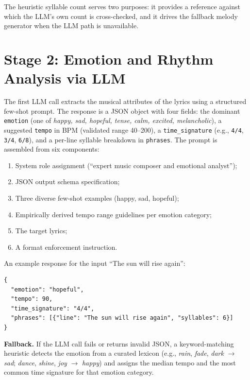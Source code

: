 The heuristic syllable count serves two purposes: it provides a reference
against which the LLM's own count is cross-checked, and it drives the
fallback melody generator when the LLM path is unavailable.

\section{Stage 2: Emotion and Rhythm Analysis via LLM}
\label{sec:mt-stage2}

The first LLM call extracts the musical attributes of the lyrics using a
structured few-shot prompt. The response is a JSON object with four fields:
the dominant \texttt{emotion} (one of \emph{happy, sad, hopeful, tense,
calm, excited, melancholic}), a suggested \texttt{tempo} in BPM (validated
range 40--200), a \texttt{time\_signature} (e.g., \texttt{4/4},
\texttt{3/4}, \texttt{6/8}), and a per-line syllable breakdown in
\texttt{phrases}. The prompt is assembled from six components:

\begin{enumerate}
    \item System role assignment (``expert music composer and emotional
    analyst'');
    \item JSON output schema specification;
    \item Three diverse few-shot examples (happy, sad, hopeful);
    \item Empirically derived tempo range guidelines per emotion category;
    \item The target lyrics;
    \item A format enforcement instruction.
\end{enumerate}

An example response for the input \enquote{The sun will rise again}:

\begin{lstlisting}[style=jsonStyle]
{
  "emotion": "hopeful",
  "tempo": 90,
  "time_signature": "4/4",
  "phrases": [{"line": "The sun will rise again", "syllables": 6}]
}
\end{lstlisting}

\textbf{Fallback.} If the LLM call fails or returns invalid JSON, a
keyword-matching heuristic detects the emotion from a curated lexicon
(e.g., \emph{rain}, \emph{fade}, \emph{dark} $\rightarrow$ \emph{sad};
\emph{dance}, \emph{shine}, \emph{joy} $\rightarrow$ \emph{happy}) and
assigns the median tempo and the most common time signature for that emotion
category.

